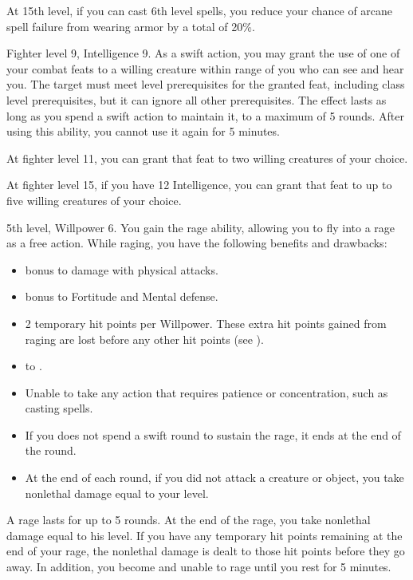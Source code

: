     At 15th level, if you can cast 6th level spells, you reduce your chance of arcane spell failure from wearing armor by a total of 20\%.

    \featpres Fighter level 9, Intelligence 9.
    \featben As a swift action, you may grant the use of one of your combat feats to a willing creature within \rngmed range of you who can see and hear you.
    The target must meet level prerequisites for the granted feat, including class level prerequisites, but it can ignore all other prerequisites.
    The effect lasts as long as you spend a swift action to maintain it, to a maximum of 5 rounds.
    After using this ability, you cannot use it again for 5 minutes.

    At fighter level 11, you can grant that feat to two willing creatures of your choice.

    At fighter level 15, if you have 12 Intelligence, you can grant that feat to up to five willing creatures of your choice.

    \featpres 5th level, Willpower 6.
    \featben You gain the rage ability, allowing you to fly into a rage as a free action.
    While raging, you have the following benefits and drawbacks:
    \begin{itemize}
        \item {} bonus to damage with physical attacks.
        \item {} bonus to Fortitude and Mental defense.
        \item 2 temporary hit points per Willpower.
            These extra hit points gained from raging are lost before any other hit points (see ).
        \item {} to .
        \item Unable to take any action that requires patience or concentration, such as casting spells.
        \item If you does not spend a swift round to sustain the rage, it ends at the end of the round.
        \item At the end of each round, if you did not attack a creature or object, you take nonlethal damage equal to your level.
    \end{itemize}

    A rage lasts for up to 5 rounds.
    At the end of the rage, you take nonlethal damage equal to his level.
    If you have any temporary hit points remaining at the end of your rage, the nonlethal damage is dealt to those hit points before they go away.
    In addition, you become \fatigued and unable to rage until you rest for 5 minutes.

